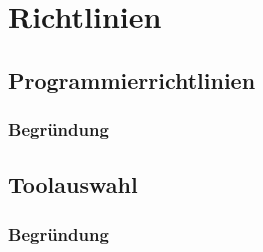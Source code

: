 \chapter{Richtlinien}
\section{Programmierrichtlinien}
\subsection{Begründung}
\section{Toolauswahl}
\subsection{Begründung}
